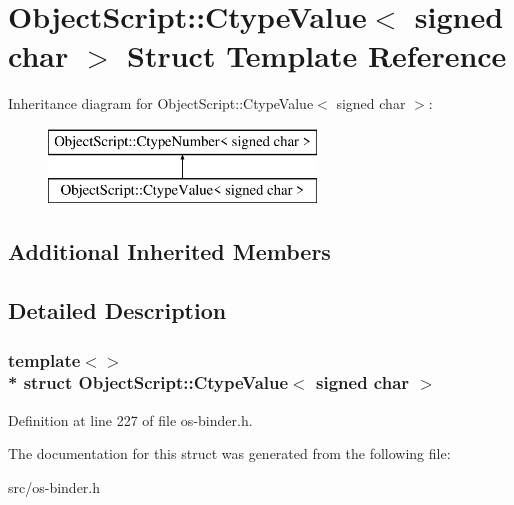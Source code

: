 \hypertarget{struct_object_script_1_1_ctype_value_3_01signed_01char_01_4}{}\section{Object\+Script\+:\+:Ctype\+Value$<$ signed char $>$ Struct Template Reference}
\label{struct_object_script_1_1_ctype_value_3_01signed_01char_01_4}
Inheritance diagram for Object\+Script\+:\+:Ctype\+Value$<$ signed char $>$\+:\begin{figure}[H]
\begin{center}
\leavevmode
\includegraphics[height=2.000000cm]{struct_object_script_1_1_ctype_value_3_01signed_01char_01_4}
\end{center}
\end{figure}
\subsection*{Additional Inherited Members}


\subsection{Detailed Description}
\subsubsection*{template$<$$>$\\*
struct Object\+Script\+::\+Ctype\+Value$<$ signed char $>$}



Definition at line 227 of file os-\/binder.\+h.



The documentation for this struct was generated from the following file\+:\begin{DoxyCompactItemize}
\item 
src/os-\/binder.\+h\end{DoxyCompactItemize}
